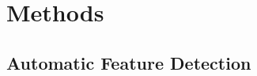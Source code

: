 %
%
%




\section{Methods}
\label{sec:methods}


\subsection{Automatic Feature Detection}
\label{subsec:methods-1-log}

